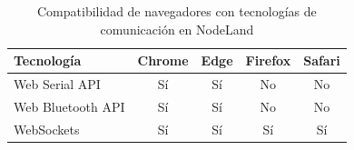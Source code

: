 \label{apx:browser-compatibility}

\begin{table}[H]
    \caption{Compatibilidad de navegadores con tecnologías de comunicación en NodeLand}
    \label{tab:browser-compatibility}
    \begingroup
    \begin{tabular}{@{}lcccc@{}}
        \hline
        \textbf{Tecnología} & \textbf{Chrome} & \textbf{Edge} & \textbf{Firefox} & \textbf{Safari} \\
        \hline
        Web Serial API      & Sí              & Sí            & No               & No              \\
        Web Bluetooth API   & Sí              & Sí            & No               & No              \\
        WebSockets          & Sí              & Sí            & Sí               & Sí              \\
        \hline
    \end{tabular}
    \endgroup
\end{table}